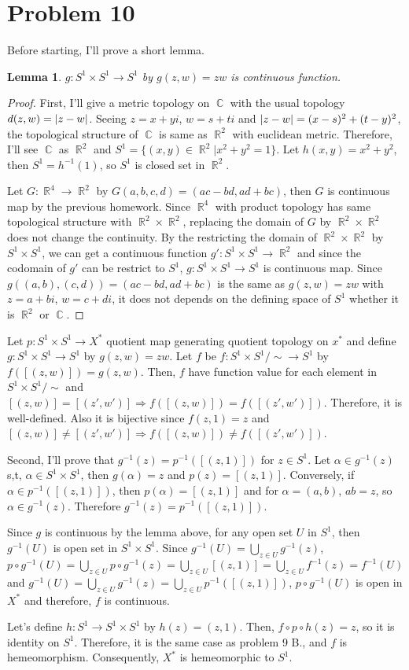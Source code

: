 \documentclass{article}
\DeclareMathOperator{\cc}{\mathbb{C}}
\DeclareMathOperator{\rr}{\mathbb{R}}
\DeclarePairedDelimiter\abs{\lvert}{\rvert}%
\newtheorem{lemma}{Lemma}
\begin{document}
\section*{Problem 10}
Before starting, I'll prove a short lemma.
\begin{lemma}
$g:S^1\times S^1\rightarrow S^1$ by $g(z,w)=zw$ is continuous function.
\end{lemma}
\begin{proof}
First, I'll give a metric topology on $\cc$ with the usual topology $d(z,w)=\abs{z-w}$. Seeing $z=x+yi$, $w=s+ti$ and $\abs{z-w}=(x-s)^2+(t-y)^2$, the topological structure of $\cc$ is same as $\rr^2$ with euclidean metric. Therefore, I'll see $\cc$ as $\rr^2$ and $S^1=\{(x,y)\in \rr^2|x^2+y^2=1\}$. Let $h(x,y)=x^2+y^2$, then $S^1=h^{-1}(1)$, so $S^1$ is closed set in $\rr^2$.

Let $G:\rr^4\rightarrow \rr^2$ by $G(a,b,c,d)=(ac-bd, ad+bc)$, then $G$ is continuous map by the previous homework. Since $\rr^4$ with product topology has same topological structure with $\rr^2\times \rr^2$, replacing the domain of $G$ by $\rr^2\times\rr^2$ does not change the continuity. By the restricting the domain of $\rr^2\times \rr^2$ by $S^1\times S^1$, we can get a continuous function $g':S^1\times S^1\rightarrow \rr^2$ and since the codomain of $g'$ can be restrict to $S^1$, $g:S^1\times S^1\rightarrow S^1$ is continuous map. Since $g((a,b),(c,d))=(ac-bd, ad+bc)$ is the same as $g(z,w)=zw$ with $z=a+bi$, $w=c+di$, it does not depends on the defining space of $S^1$ whether it is $\rr^2$ or $\cc$.
\end{proof}

Let $p:S^1\times S^1\rightarrow X^*$ quotient map generating quotient topology on $x^*$ and define $g:S^1\times S^1\rightarrow S^1$ by $g(z,w)=zw$. Let $f$ be $f:S^1\times S^1/\sim\rightarrow S^1$ by $f([(z,w)])=g(z,w)$. Then, $f$ have function value for each element in $S^1\times S^1/\sim$ and $[(z,w)]=[(z',w')]\Rightarrow f([(z,w)])=f([(z',w')])$. Therefore, it is well-defined. Also it is bijective since $f(z,1)=z$ and $[(z,w)]\neq[(z',w')]\Rightarrow  f([(z,w)])\neq f([(z',w')])$.

Second, I'll prove that $g^{-1}(z)=p^{-1}([(z,1)])$ for $z\in S^1$. Let $\alpha\in g^{-1}(z)$ s,t, $\alpha\in S^1\times S^1$, then $g(\alpha)=z$ and $p(z)=[(z,1)]$. Conversely, if $\alpha\in p^{-1}([(z,1)])$, then $p(\alpha)=[(z,1)]$ and for $\alpha=(a,b)$, $ab=z$, so $\alpha\in g^{-1}(z)$. Therefore $g^{-1}(z)=p^{-1}([(z,1)])$.

Since $g$ is continuous by the lemma above, for any open set $U$ in $S^1$, then $g^{-1}(U)$ is open set in $S^1\times S^1$. Since $g^{-1}(U)=\bigcup_{z\in U} g^{-1}(z)$, $p\circ g^{-1}(U)=\bigcup_{z\in U} p\circ g^{-1}(z)=\bigcup_{z\in U} [(z,1)]=\bigcup_{z\in U}f^{-1}(z)=f^{-1}(U)$ and $g^{-1}(U)=\bigcup_{z\in U}g^{-1}(z)=\bigcup_{z\in U}p^{-1}([(z,1)])$, $p\circ g^{-1}(U)$ is open in $X^*$ and therefore, $f$ is continuous.

Let's define $h:S^1\rightarrow S^1\times S^1$ by $h(z)=(z, 1)$. Then, $f\circ p\circ h(z)=z$, so it is identity on $S^1$. Therefore, it is the same case as problem 9 B., and $f$ is hemeomorphism. Consequently, $X^*$ is hemeomorphic to $S^1$.
\end{document}
